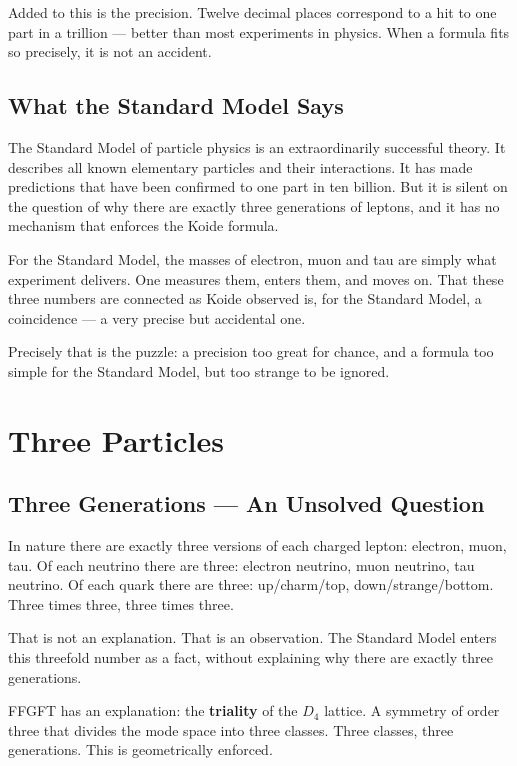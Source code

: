 \documentclass[12pt,oneside]{book}
\begin{document}
Added to this is the precision. Twelve decimal places correspond to a hit to one part in a trillion --- better than most experiments in physics. When a formula fits so precisely, it is not an accident.

\section{What the Standard Model Says}

The Standard Model of particle physics is an extraordinarily successful theory. It describes all known elementary particles and their interactions. It has made predictions that have been confirmed to one part in ten billion. But it is silent on the question of why there are exactly three generations of leptons, and it has no mechanism that enforces the Koide formula.

For the Standard Model, the masses of electron, muon and tau are simply what experiment delivers. One measures them, enters them, and moves on. That these three numbers are connected as Koide observed is, for the Standard Model, a coincidence --- a very precise but accidental one.

Precisely that is the puzzle: a precision too great for chance, and a formula too simple for the Standard Model, but too strange to be ignored.

\chapter{Three Particles}

\section{Three Generations --- An Unsolved Question}

In nature there are exactly three versions of each charged lepton: electron, muon, tau. Of each neutrino there are three: electron neutrino, muon neutrino, tau neutrino. Of each quark there are three: up/charm/top, down/strange/bottom. Three times three, three times three.

That is not an explanation. That is an observation. The Standard Model enters this threefold number as a fact, without explaining why there are exactly three generations.

FFGFT has an explanation: the \textbf{triality} of the $D_4$ lattice. A symmetry of order three that divides the mode space into three classes. Three classes, three generations. This is geometrically enforced.
\end{document}
